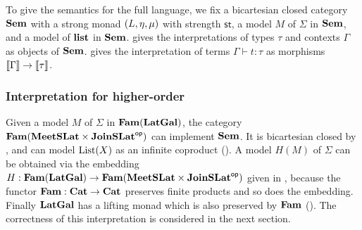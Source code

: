 To give the semantics for the full language, we fix a bicartesian closed category $\mathbf{Sem}$ with a strong monad
$(L, \eta, \mu)$ with strength $\mathsf{st}$, a model $M$ of $\Sigma$ in $\mathbf{Sem}$, and a model of $\mathbf{list}$
in $\mathbf{Sem}$.  gives the interpretations of types $\tau$ and contexts $\Gamma$ as objects
of $\mathbf{Sem}$.  gives the interpretation of terms $\Gamma \vdash t: \tau$ as morphisms
$\llbracket \Gamma \rrbracket \to \llbracket \tau \rrbracket$.

\subsubsection{Interpretation for higher-order \GPS}

Given a model $M$ of $\Sigma$ in $\mathbf{Fam}(\mathbf{LatGal})$, the category $\mathbf{Fam}(\mathbf{MeetSLat} \times \mathbf{JoinSLat}^{\mathsf{op}})$ can
implement $\mathbf{Sem}$. It is bicartesian closed by , and can model $\mathrm{List}(X)$ as an
infinite coproduct (). A model $H(M)$ of $\Sigma$ can be
obtained via the embedding $H: \mathbf{Fam}(\mathbf{LatGal}) \to \mathbf{Fam}(\mathbf{MeetSLat} \times \mathbf{JoinSLat}^{\mathsf{op}})$ given in
, because the functor $\mathbf{Fam}: \mathbf{Cat} \to \mathbf{Cat}$ preserves finite products and so does the
embedding. Finally $\mathbf{LatGal}$ has a lifting monad which is also preserved by $\mathbf{Fam}$
(). The correctness of this interpretation is considered in the next section.
